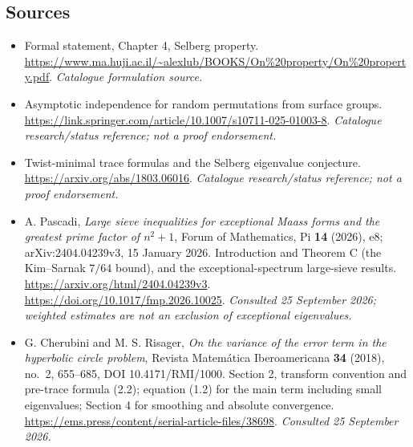 \documentclass[11pt]{article}
\begin{document}
\subsection{Sources}
\begin{itemize}\raggedright
\item[\textnormal{[S1]}]\hypertarget{source:9400079:1}{} Formal statement, Chapter 4, Selberg property.
\url{https://www.ma.huji.ac.il/~alexlub/BOOKS/On%20property/On%20property.pdf}.
{\small\textit{Catalogue formulation source.}}
\item[\textnormal{[S2]}]\hypertarget{source:9400079:2}{} Asymptotic independence for random permutations from surface groups.
\url{https://link.springer.com/article/10.1007/s10711-025-01003-8}.
{\small\textit{Catalogue research/status reference; not a proof endorsement.}}
\item[\textnormal{[S3]}]\hypertarget{source:9400079:3}{} Twist-minimal trace formulas and the Selberg eigenvalue conjecture.
\url{https://arxiv.org/abs/1803.06016}.
{\small\textit{Catalogue research/status reference; not a proof endorsement.}}
\item[\textnormal{[E1]}]\hypertarget{extra:9400079:1}{}
A. Pascadi, \emph{Large sieve inequalities for exceptional Maass forms and
the greatest prime factor of $n^2+1$}, Forum of Mathematics, Pi \textbf{14}
(2026), e8; arXiv:2404.04239v3, 15 January 2026. Introduction and Theorem C
(the Kim--Sarnak $7/64$ bound), and the exceptional-spectrum large-sieve
results. \url{https://arxiv.org/html/2404.04239v3}.
\url{https://doi.org/10.1017/fmp.2026.10025}.
{\small\textit{Consulted 25 September 2026; weighted estimates are not an
exclusion of exceptional eigenvalues.}}
\item[\textnormal{[E2]}]\hypertarget{extra:9400079:2}{}
G. Cherubini and M. S. Risager, \emph{On the variance of the error term in
the hyperbolic circle problem}, Revista Matem\'atica Iberoamericana
\textbf{34} (2018), no.~2, 655--685, DOI 10.4171/RMI/1000.
Section 2, transform convention and pre-trace formula (2.2); equation (1.2)
for the main term including small eigenvalues; Section 4 for smoothing and
absolute convergence.
\url{https://ems.press/content/serial-article-files/38698}.
{\small\textit{Consulted 25 September 2026.}}
\end{itemize}
\end{document}
